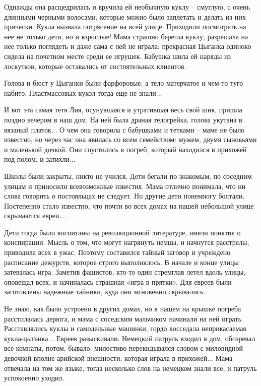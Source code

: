 Однажды она расщедрилась и вручила ей необычную куклу – смуглую, с очень
длинными черными волосами, которые можно было заплетать и делать из них
прически. Кукла вызвала потрясение на всей улице. Приходили посмотреть на нее
не только дети, но и взрослые! Мама страшно берегла куклу, разрешала на нее
только поглядеть и даже сама с ней не играла: прекрасная Цыганка одиноко сидела
на почетном месте среди ее игрушек. Бабушка шила ей наряды из лоскутков,
которые оставались от состоятельных клиентов.

Голова и бюст у Цыганки были фарфоровые, а тело матерчатое и чем-то туго
набито. Пластмассовых кукол тогда еще не знали...

И вот эта самая тетя Лия, осунувшаяся и утратившая весь свой шик, пришла поздно
вечером в наш дом. На ней была драная телогрейка, голова укутана в вязаный
платок... О чем она говорила с бабушками и тетками – маме не было известно, но
через час она явилась со всем семейством: мужем, двумя сыновьями и маленькой
дочкой. Они спустились в погреб, который находился в прихожей под полом, и
затихли...

Школы были закрыты, никто не учился. Дети бегали по знакомым, по соседним
улицам и приносили всевозможные известия. Мама отлично понимала, что ни слова
говорить о постояльцах не следует. Но другие дети понемногу болтали. Постепенно
стало известно, что почти во всех домах на нашей небольшой улице скрываются
евреи...

Дети тогда были воспитаны на революционной литературе, имели понятие о
конспирации. Мысль о том, что могут нагрянуть немцы, и начнутся расстрелы,
приводила всех в ужас. Поэтому составился тайный заговор и учреждено расписание
дежурств, которое строго выполнялось. В начале и конце улицы затевалась игра.
Заметив фашистов, кто-то один стремглав летел вдоль улицы, оповещал всех, и
начиналась страшная «игра в прятки». Для евреев были заготовлены надежные
тайники, куда они мгновенно скрывались.

Не знаю, как было устроено в других домах, но в нашем на крышке погреба
расстилалась дерюга, и мама с соседским мальчиком начинали на ней играть.
Расставлялись куклы и самодельные машинки, гордо восседала неприкасаемая
кукла-цыганка... Евреев разыскивали. Немецкий патруль входил в дом, обозревал все
комнаты, потом, бывало, милостиво перекидывался словом с миловидной девочкой
вполне арийской внешности, которая играла в прихожей... Мама отвечала на том же
языке, тогда несколько слов на немецком знали все, и патруль успокоенно уходил.

